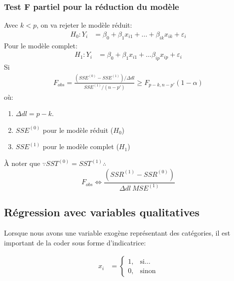 \documentclass[10pt, french]{article}
\begin{document}
\begin{multicols*}{3}
\subsubsection*{Test F partiel pour la réduction du modèle}
Avec $k < p$, on va rejeter le modèle réduit:
\begin{align*}
H_0 : Y_i &= \beta_0 + \beta_1 x_{i1} + ... + \beta_{ik} x_{ik} + \varepsilon_i 
\end{align*}
Pour le modèle complet:
\begin{align*}
H_1 : Y_i &= \beta_0 + \beta_1 x_{i1} + ... \beta_{ip} x_{ip} + \varepsilon_i 
\end{align*}
Si
\begin{align*}
F_{obs} = \frac{(SSE^{(0)} - SSE^{(1)}) / \Delta dl}{SSE^{(1)} / (n-p')} \geq F_{p-k, n-p'}(1- \alpha)
\end{align*}
où:
\begin{enumerate}
	\item[] $\Delta dl = p - k$.
	\item[] $SSE^{(0)}$ pour le modèle réduit ($H_0$)
	\item[] $SSE^{(1)}$ pour le modèle complet ($H_1$)
\end{enumerate}

À noter que $\because SST^{(0)} = SST^{(1)} \therefore$
\[
	F_{obs} \Leftrightarrow \frac{(SSR^{(1)} - SSR^{(0)})}{\Delta dl \  MSE^{(1)}}
\]

\subsection*{Régression avec variables qualitatives}

Lorsque nous avons une variable exogène représentant des catégories, il est important de la coder sous forme d'indicatrice:

\begin{align*}
	x_{i} &= \left\{
	\begin{matrix}
		1, & \text{si}\dots \\
		0, & \text{sinon}
	\end{matrix}
	\right.
\end{align*}


\end{multicols*}
\end{document}
